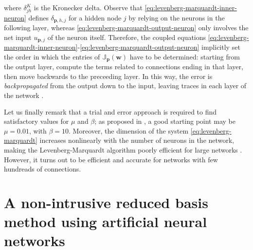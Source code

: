 \documentclass{elsarticle}
\numberwithin{equation}{section}
\theoremstyle{theorem}
\theoremstyle{definition}
\theoremstyle{remark}
\theoremstyle{proposition}
\numberwithin{figure}{section}
\begin{document}
		where $\delta_{jh}^K$ is the Kronecker delta. Observe that \eqref{eq:levenberg-marquardt-inner-neuron} defines $\delta_{\mathbf{p},h,j}$ for a hidden node $j$ by relying on the neurons in the following layer, whereas \eqref{eq:levenberg-marquardt-output-neuron} only involves the net input $u_{\mathbf{p},j}$ of the neuron itself. Therefore, the coupled equations \eqref{eq:levenberg-marquardt-inner-neuron}-\eqref{eq:levenberg-marquardt-output-neuron} implicitly set the order in which the entries of $\mathbb{J}_{\mathbf{p}}(\mathbf{w})$ have to be determined: starting from the output layer, compute the terms related to connections ending in that layer, then move backwards to the preceeding layer. In this way, the error is \emph{backpropagated} from the output down to the input, leaving traces in each layer of the network \cite{Kri07, WH60}.
		
		Let us finally remark that a trial and error approach is required to find satisfactory values for $\mu$ and $\beta$; as proposed in \cite{Mar63}, a good starting point may be $\mu = 0.01$, with $\beta = 10$. Moreover, the dimension of the system \eqref{eq:levenberg-marquardt} increases nonlinearly with the number of neurons in the network, making the Levenberg-Marquardt algorithm poorly efficient for large networks \cite{Hag94}. However, it turns out to be efficient and accurate for networks with few hundreads of connections. 
		
		
	
	\section{A non-intrusive reduced basis method using artificial neural networks}
	\label{section:A non-intrusive RB method using neural networks}
							
\end{document}

